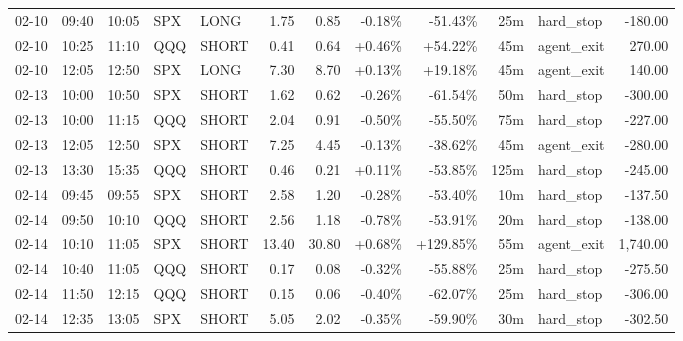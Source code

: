 \documentclass[11pt,a4paper,twoside]{article}
\begin{document}
\begin{center}
\begin{longtable}{>{\color{txtmain}}l l l l l r r r r r >{\color{txtmain}}l r}
02-10 & 09:40 & 10:05 & SPX & LONG & 1.75 & 0.85 & \textcolor{lossred}{-0.18\%} & \textcolor{lossred}{-51.43\%} & 25m & hard\_stop & \textcolor{lossred}{-180.00} \\
02-10 & 10:25 & 11:10 & QQQ & SHORT & 0.41 & 0.64 & \textcolor{wingreen}{+0.46\%} & \textcolor{wingreen}{+54.22\%} & 45m & agent\_exit & \textcolor{wingreen}{270.00} \\
02-10 & 12:05 & 12:50 & SPX & LONG & 7.30 & 8.70 & \textcolor{wingreen}{+0.13\%} & \textcolor{wingreen}{+19.18\%} & 45m & agent\_exit & \textcolor{wingreen}{140.00} \\
02-13 & 10:00 & 10:50 & SPX & SHORT & 1.62 & 0.62 & \textcolor{lossred}{-0.26\%} & \textcolor{lossred}{-61.54\%} & 50m & hard\_stop & \textcolor{lossred}{-300.00} \\
02-13 & 10:00 & 11:15 & QQQ & SHORT & 2.04 & 0.91 & \textcolor{lossred}{-0.50\%} & \textcolor{lossred}{-55.50\%} & 75m & hard\_stop & \textcolor{lossred}{-227.00} \\
02-13 & 12:05 & 12:50 & SPX & SHORT & 7.25 & 4.45 & \textcolor{lossred}{-0.13\%} & \textcolor{lossred}{-38.62\%} & 45m & agent\_exit & \textcolor{lossred}{-280.00} \\
02-13 & 13:30 & 15:35 & QQQ & SHORT & 0.46 & 0.21 & \textcolor{wingreen}{+0.11\%} & \textcolor{lossred}{-53.85\%} & 125m & hard\_stop & \textcolor{lossred}{-245.00} \\
02-14 & 09:45 & 09:55 & SPX & SHORT & 2.58 & 1.20 & \textcolor{lossred}{-0.28\%} & \textcolor{lossred}{-53.40\%} & 10m & hard\_stop & \textcolor{lossred}{-137.50} \\
02-14 & 09:50 & 10:10 & QQQ & SHORT & 2.56 & 1.18 & \textcolor{lossred}{-0.78\%} & \textcolor{lossred}{-53.91\%} & 20m & hard\_stop & \textcolor{lossred}{-138.00} \\
02-14 & 10:10 & 11:05 & SPX & SHORT & 13.40 & 30.80 & \textcolor{wingreen}{+0.68\%} & \textcolor{wingreen}{+129.85\%} & 55m & agent\_exit & \textcolor{wingreen}{1,740.00} \\
02-14 & 10:40 & 11:05 & QQQ & SHORT & 0.17 & 0.08 & \textcolor{lossred}{-0.32\%} & \textcolor{lossred}{-55.88\%} & 25m & hard\_stop & \textcolor{lossred}{-275.50} \\
02-14 & 11:50 & 12:15 & QQQ & SHORT & 0.15 & 0.06 & \textcolor{lossred}{-0.40\%} & \textcolor{lossred}{-62.07\%} & 25m & hard\_stop & \textcolor{lossred}{-306.00} \\
02-14 & 12:35 & 13:05 & SPX & SHORT & 5.05 & 2.02 & \textcolor{lossred}{-0.35\%} & \textcolor{lossred}{-59.90\%} & 30m & hard\_stop & \textcolor{lossred}{-302.50} \\

\end{longtable}
\end{center}
\end{document}
